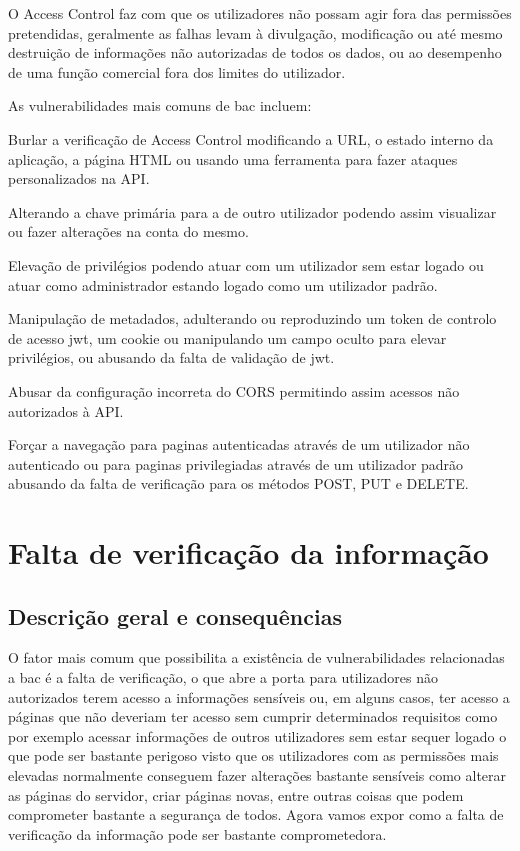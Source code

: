 \documentclass{report}
\begin{document}
O Access Control faz com que os utilizadores não possam agir fora das permissões pretendidas, geralmente as falhas levam à divulgação, modificação ou até mesmo destruição de informações não autorizadas de todos os dados, ou ao desempenho de uma função comercial fora dos limites do utilizador.

As vulnerabilidades mais comuns de \ac{bac} incluem:
\begin{list}{--}{}
    \item Burlar a verificação de Access Control modificando a URL, o estado interno da aplicação, a página HTML ou usando uma ferramenta para fazer ataques personalizados na API.
    \item Alterando a chave primária para a de outro utilizador podendo assim visualizar ou fazer alterações na conta do mesmo.
    \item Elevação de privilégios podendo atuar com um utilizador sem estar logado ou atuar como administrador estando logado como um utilizador padrão.
    \item Manipulação de metadados, adulterando ou reproduzindo um token de controlo de acesso \ac{jwt}, um cookie ou manipulando um campo oculto para elevar privilégios, ou abusando da falta de validação de \ac{jwt}.
    \item Abusar da configuração incorreta do CORS permitindo assim acessos não autorizados à API.
    \item Forçar a navegação para paginas autenticadas através de um utilizador não autenticado ou para paginas privilegiadas através de um utilizador padrão abusando da falta de verificação para os métodos POST, PUT e DELETE.
\end{list}
\clearpage
\section{Falta de verificação da informação}
\subsection{Descrição geral e consequências}

O fator mais comum que possibilita a existência de vulnerabilidades relacionadas a \ac{bac} é a falta de verificação, o que abre a porta para utilizadores não autorizados terem acesso a informações sensíveis ou, em alguns casos, ter acesso a páginas que não deveriam ter acesso sem cumprir determinados requisitos como por exemplo acessar informações de outros utilizadores sem estar sequer logado o que pode ser bastante perigoso visto que os utilizadores com as permissões mais elevadas normalmente conseguem fazer alterações bastante sensíveis como alterar as páginas do servidor, criar páginas novas, entre outras coisas que podem comprometer bastante a segurança de todos. Agora vamos expor como a falta de verificação da informação pode ser bastante comprometedora.
\clearpage
\end{document}
